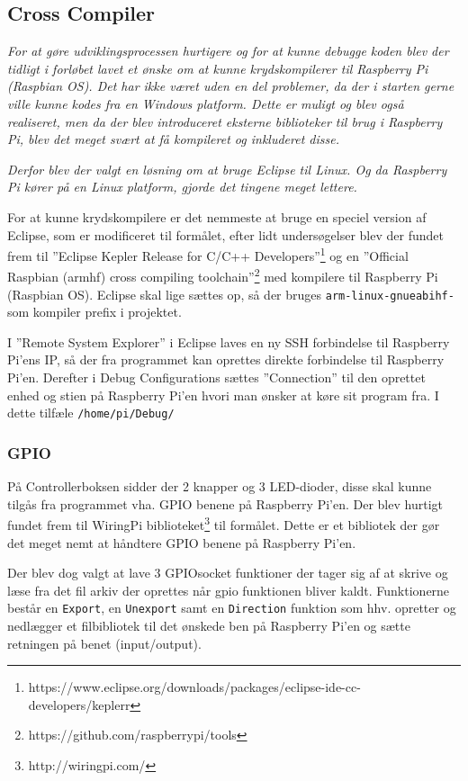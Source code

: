 \subsection*{Cross Compiler}

\textit{For at gøre udviklingsprocessen hurtigere og for at kunne debugge koden blev der tidligt i forløbet lavet et ønske om at kunne krydskompilerer til Raspberry Pi (Raspbian OS). Det har ikke været uden en del problemer, da der i starten gerne ville kunne kodes fra en Windows platform. Dette er muligt og blev også realiseret, men da der blev introduceret eksterne biblioteker til brug i Raspberry Pi, blev det meget svært at få kompileret og inkluderet disse.}

\textit{Derfor blev der valgt en løsning om at bruge Eclipse til Linux. Og da Raspberry Pi kører på en Linux platform, gjorde det tingene meget lettere.}

For at kunne krydskompilere er det nemmeste at bruge en speciel version af Eclipse, som er modificeret til formålet, efter lidt undersøgelser blev der fundet frem til ''Eclipse Kepler Release for C/C++ Developers''\footnote{https://www.eclipse.org/downloads/packages/eclipse-ide-cc-developers/keplerr} og en ''Official Raspbian (armhf) cross compiling toolchain''\footnote{https://github.com/raspberrypi/tools} med kompilere til Raspberry Pi (Raspbian OS). Eclipse skal lige sættes op, så der bruges \verb+arm-linux-gnueabihf-+ som kompiler prefix i projektet.

I ''Remote System Explorer'' i Eclipse laves en ny SSH forbindelse til Raspberry Pi'ens IP, så der fra programmet kan oprettes direkte forbindelse til Raspberry Pi'en. Derefter i Debug Configurations sættes ''Connection'' til den oprettet enhed og stien på Raspberry Pi'en hvori man ønsker at køre sit program fra. I dette tilfæle \verb+/home/pi/Debug/+

\subsubsection*{GPIO}

På Controllerboksen sidder der 2 knapper og 3 LED-dioder, disse skal kunne tilgås fra programmet vha. GPIO benene på Raspberry Pi'en. Der blev hurtigt fundet frem til WiringPi biblioteket\footnote{http://wiringpi.com/} til formålet. Dette er et bibliotek der gør det meget nemt at håndtere GPIO benene på Raspberry Pi'en.

Der blev dog valgt at lave 3 GPIOsocket funktioner der tager sig af at skrive og læse fra det fil arkiv der oprettes når gpio funktionen bliver kaldt. Funktionerne består en \verb+Export+, en \verb+Unexport+ samt en \verb+Direction+ funktion som hhv. opretter og nedlægger et filbibliotek til det ønskede ben på Raspberry Pi'en og sætte retningen på benet (input/output).

